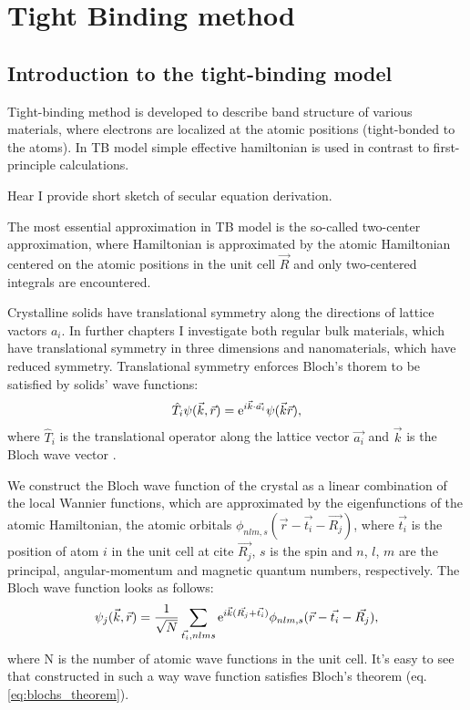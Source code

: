 \chapter{Tight Binding method}
\label{ch:theory}
\section{Introduction to the tight-binding model}
Tight-binding method is developed to describe band structure of various materials, where electrons are localized at the atomic positions (tight-bonded to the atoms). In TB model simple effective hamiltonian is used in contrast to first-principle calculations. 

Hear I provide short sketch of secular equation derivation.

The most essential approximation in TB model is the so-called two-center approximation, where Hamiltonian is approximated by the atomic Hamiltonian centered on the atomic positions in the unit cell $\vec{R}$ and only two-centered integrals are encountered.

Crystalline solids have translational symmetry along the directions of lattice vactors $a_i$. In further chapters I investigate both regular bulk materials, which have translational symmetry in three dimensions and nanomaterials, which have reduced symmetry. Translational symmetry enforces Bloch's thorem to be satisfied by solids' wave functions:
\begin{equation} \label{eq:blochs_theorem}
	\hat{T}_i \psi(\vec{k},\vec{r}) = \mathrm{e}^{i \vec{k} \cdot \vec{a_i}} \psi(\vec{k}\vec{r}),
\end{equation}
where $\hat{T}_i$ is the translational operator along the lattice vector $\vec{a_i}$ and $\vec{k}$ is the Bloch wave vector \cite{kittel}.

We construct the Bloch wave function of the crystal as a linear combination of the local Wannier functions, which are approximated by the eigenfunctions of the atomic Hamiltonian, the atomic orbitals $\phi_{nlm, s}(\vec{r} - \vec{t_i} - \vec{R_j})$, where $\vec{t_i}$ is the position of atom $i$ in the unit cell at cite $\vec{R_j}$, $s$ is the spin and $n$, $l$, $m$ are the principal, angular-momentum and magnetic quantum numbers, respectively. The Bloch wave function looks as follows:
\begin{equation} \label{eq:wave_fun}
	\psi_{j}(\vec{k},\vec{r}) = \frac{1}{\sqrt{N}} \sum_{\vec{t_i}, nlms} \mathrm{e}^{i\vec{k}(\vec{R_j} + \vec{t_i})} \phi_{nlm, s} (\vec{r} - \vec{t_i} - \vec{R_j}),
\end{equation}
where N is the number of atomic wave functions in the unit cell. It's easy to see that constructed in such a way wave function satisfies Bloch's theorem (eq. \ref{eq:blochs_theorem}).

